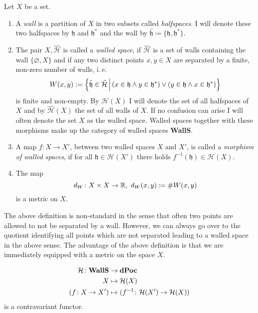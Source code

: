 \begin{defin}
  Let \(X\) be a set.
  \begin{enumerate}
  \item A \emph{wall} is a partition of \(X\) in two subsets called \emph{halfspaces}. I will denote these two halfspaces by \(\mathfrak{h}\) and \(\mathfrak{h}^\ast\) and the wall by \(\mathfrak{\hat h} \coloneqq \{\mathfrak{h}, \mathfrak{h}^\ast\}\).
  \item The pair \(X, \mathcal{\hat H}\) is called a \emph{walled space}, if \(\mathcal{\hat H}\) is a set of walls containing the wall \(\{\varnothing, X\}\) and if any two distinct points \(x,y \in X\) are separated by a finite, non-zero number of walls, i.\,e.
    \[
      W(x,y) := \left\{\mathfrak{\hat h} \in \mathcal{\hat H} \,\middle|\, (x \in \mathfrak{h} \wedge y \in \mathfrak{h}^\ast) \vee (y \in \mathfrak{h} \wedge x \in \mathfrak{h}^\ast)\right\}
    \]
    is finite and non-empty. By \(\mathcal{H}(X)\) I will denote the set of all halfspaces of \(X\) and by \(\mathcal{\hat H}(X)\) the set of all walls of \(X\). If no confusion can arise I will often denote the set \(X\) as the walled space. Walled spaces together with these morphisms make up the category of walled spaces \textbf{WallS}.
  \item A map \(f: X \to X'\), between two walled spaces \(X\) and \(X'\), is called a \emph{morphism of walled spaces}, if for all \(\mathfrak{h} \in \mathcal{H}(X')\) there holds \(f^{-1}(\mathfrak{h}) \in \mathcal{H}(X)\).
  \item The map
    \[
      d_W\colon X \times X \to \mathbb{R},\ d_W(x,y) \coloneqq \# W(x,y)
    \]
    is a metric on \(X\).
  \end{enumerate}
\end{defin}

\begin{rem}
  The above definition is non-standard in the sense that often two points are allowed to not be separated by a wall. However, we can always go over to the quotient identifying all points which are not separated leading to a walled space in the above sense. The advantage of the above definition is that we are immediately equipped with a metric on the space \(X\).
\end{rem}

\begin{prop}
  \begin{align*}
    \mathcal{H} \colon {\normalfont \textbf{WallS}} & \to {\normalfont \textbf{dPoc}}\\
    X & \mapsto \mathcal{H}(X)\\
    (f\colon X \to X') & \mapsto (f^{-1}\colon \mathcal{H}(X') \to \mathcal{H}(X))
  \end{align*}
  is a contravariant functor.
\end{prop}

